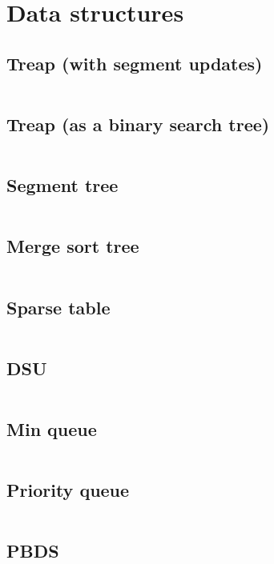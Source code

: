 ﻿\documentclass[10pt,twocolumn,oneside]{article}
\begin{document}
\pagestyle{fancy}
\fancyfoot{}
\fancyhead[R]{\thepage}

\section{Data structures}
\subsection{Treap (with segment updates)}
\inputminted[breaklines]{cpp}{Data structures/treap (segment updates).cpp}
\subsection{Treap (as a binary search tree)}
\inputminted[breaklines]{cpp}{Data structures/treap (as a binsearch tree).cpp}
\subsection{Segment tree}
\inputminted[breaklines]{cpp}{Data structures/segment tree.cpp}
\subsection{Merge sort tree}
\inputminted[breaklines]{cpp}{Data structures/mergesort tree.cpp}
\subsection{Sparse table}
\inputminted[breaklines]{cpp}{Data structures/sparse table.cpp}
\subsection{DSU}
\inputminted[breaklines]{cpp}{Data structures/dsu.cpp}
\subsection{Min queue}
\inputminted[breaklines]{cpp}{Data structures/min queue.cpp}
\subsection{Priority queue}
\inputminted[breaklines]{python}{Data structures/priority queue.py}
\subsection{PBDS}
\inputminted[breaklines]{cpp}{Data structures/pbds.cpp}
\end{document}

